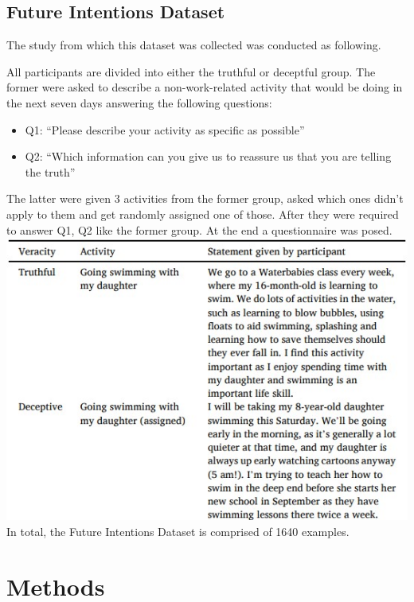 \documentclass[10pt,twocolumn,letterpaper]{article}
\begin{document}
\subsection{Future Intentions Dataset}

The study from which this dataset was collected was conducted as following.

All participants are divided into either the truthful or deceptful group.
The former were asked to describe a non-work-related activity that would be doing in the next seven days answering the following questions:

\begin{itemize}
    \item Q1: “Please describe your activity as specific as possible”
    \item Q2: “Which information can you give us to reassure us that you are telling the truth”
\end{itemize}

The latter were given 3 activities from the former group, asked which ones didn’t apply to them and get 
randomly assigned one of those. After they were required to answer Q1, Q2 like the former group.
At the end a questionnaire was posed. \\

\includegraphics[scale=0.65]{img/future_intentions_dataset.jpg} \\

In total, the Future Intentions Dataset is comprised of 1640 examples.

\section{Methods}
\end{document}
